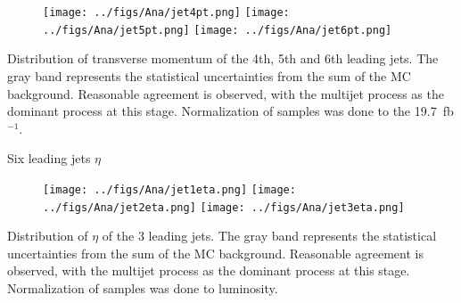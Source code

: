 \begin{frame}{}
\vspace{-.2cm}
\begin{figure}[!Hhtbp]
  \begin{center}
    \texttt{[image: ../figs/Ana/jet4pt.png]}
    \texttt{[image: ../figs/Ana/jet5pt.png]}
    \texttt{[image: ../figs/Ana/jet6pt.png]}
  \end{center}
\end{figure}

\vspace{-.2cm}
    \begin{block}{}
      \tiny \centering Distribution of transverse momentum of the 4th, 5th and 6th leading jets. The gray band represents the statistical uncertainties from the sum of the MC background. Reasonable agreement is observed, with the multijet process as the dominant process at this stage. Normalization of samples was done to the 19.7~fb$^{-1}$.
    \end{block}

\end{frame}

\begin{frame}{Six leading jets $\eta$}
\vspace{-.2cm}
\begin{figure}[!Hhtbp]
  \begin{center}
    \texttt{[image: ../figs/Ana/jet1eta.png]}
    \texttt{[image: ../figs/Ana/jet2eta.png]}
    \texttt{[image: ../figs/Ana/jet3eta.png]}
  \end{center}
\end{figure}

\vspace{-.2cm}
    \begin{block}{}
      \tiny \centering Distribution of $\eta$ of the 3 leading jets. The gray band represents the statistical uncertainties from the sum of the MC background. Reasonable agreement is observed, with the multijet process as the dominant process at this stage. Normalization of samples was done to luminosity.
    \end{block}

\end{frame}

